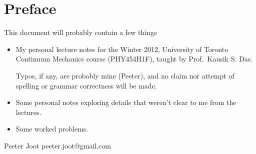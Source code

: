 \chapter*{Preface}\normalsize

This document will probably contain a few things

\begin{itemize}
\item My personal lecture notes for the Winter 2012, University of Toronto Continuum Mechanics course (PHY454H1F), taught by Prof.\ Kausik S. Das.

Typos, if any, are probably mine (Peeter), and no claim nor attempt of spelling or grammar correctness will be made.



\item Some personal notes exploring details that weren't clear to me from the lectures.

\item Some worked problems.

\end{itemize}

Peeter Joot  \quad peeter.joot@gmail.com 

